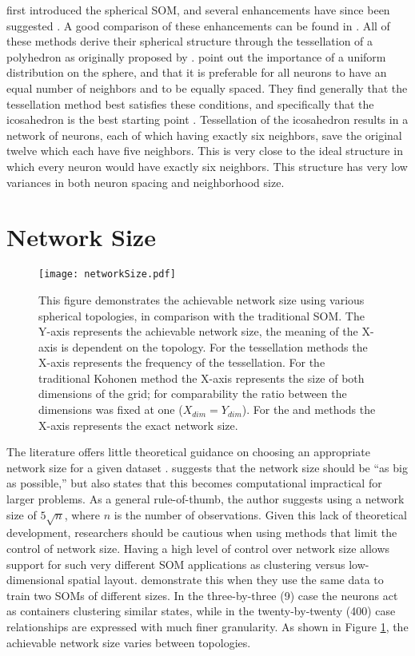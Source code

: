\cite{ritter99} first introduced the spherical SOM, and several enhancements have
since been suggested \citep{boudjemai2003,sangole03,Nishio:2006fk,wu2006}.  A
good comparison of these enhancements can be found in \cite{wu2006}.  All of
these methods derive their spherical structure through the tessellation of a
polyhedron as originally proposed by \cite{ritter99}.  \cite{wu2006} point
out the importance of a uniform distribution on the sphere, and that it is
preferable for all neurons to have an equal number of neighbors and to be
equally spaced.  They find generally that the tessellation method best satisfies
these conditions, and specifically that the icosahedron is the best starting
point \citep{wu2005}. Tessellation of the icosahedron results in a network of
neurons, each of which having exactly six neighbors, save the original twelve
which each have five neighbors.  This is very close to the ideal structure in which every
neuron would have exactly six neighbors.  This structure has very low variances
in both neuron spacing and neighborhood size.

\section{Network Size}
\begin{figure}[htb]
\centering
\texttt{[image: networkSize.pdf]}
\caption{This figure demonstrates the achievable network size using various
spherical topologies, in comparison with the traditional SOM. The Y-axis represents the achievable network size, the
meaning of the X-axis is dependent on the topology. For the tessellation
methods the X-axis represents the frequency of the tessellation. For the
traditional Kohonen method the X-axis represents the size of both dimensions of
the grid; for comparability the ratio between the dimensions was fixed at one
($X_{dim}=Y_{dim}$).  For the \cite{Rakhmanov94} and \cite{Nishio:2006fk} methods the X-axis
represents the exact network size.}
\label{fig:nSize}
\end{figure}
The literature offers little theoretical guidance on choosing an appropriate
network size for a given dataset \citep{cho1996}.  \cite{toolbox} suggests
that the network size should be ``as big as possible,'' but also states that
this becomes computational impractical for larger problems. As a general
rule-of-thumb, the author suggests using a network size of \(5\sqrt {n}\),
where \(n\) is the number of observations. Given this lack of theoretical
development, researchers should be cautious when using methods that limit the
control of network size.  Having a high level of control over network size
allows support for such very different SOM applications as clustering versus
low-dimensional spatial layout.  \cite{skupin08} demonstrate this when they
use the same data to train two SOMs of different sizes.  In the three-by-three
(9) case the neurons act as containers clustering similar states, while in the
twenty-by-twenty (400) case relationships are expressed with much finer
granularity.  As shown in Figure \ref{fig:nSize}, the achievable network size
varies between topologies.

